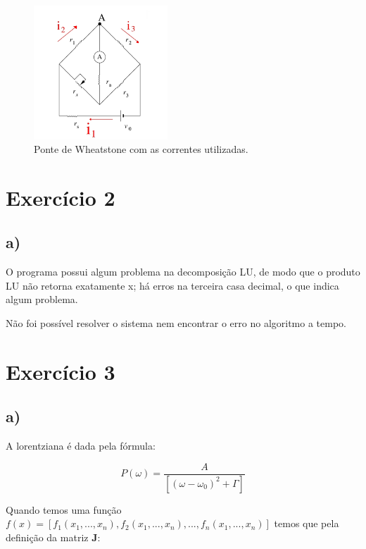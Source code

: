 \documentclass[a4wide]{report}
\begin{document}
\begin{figure}[!htb]
\centering
\includegraphics[width=0.447\textwidth]{ponte.jpg}
\caption{Ponte de Wheatstone com as correntes utilizadas.}
\label{ponte}
\end{figure}



\section*{Exercício 2}

\subsection*{a)}
O programa possui algum problema na decomposição LU, de modo que o produto LU não retorna exatamente x; há erros na terceira casa decimal, o que indica algum problema.

Não foi possível resolver o sistema nem encontrar o erro no algoritmo a tempo.







\section*{Exercício 3}
\subsection*{a)}
A lorentziana é dada pela fórmula:

\begin{equation}
P(\omega) = \frac{A}{\left[		(\omega - \omega_0)^2 + \Gamma				\right]}
\end{equation}
\label{p(w)}

Quando temos uma função $f(x) = [f_1(x_1,...,x_n),f_2(x_1,...,x_n),...,f_n(x_1,...,x_n)]$ temos que pela definição da matriz $\textbf{J}$:
\end{document}
